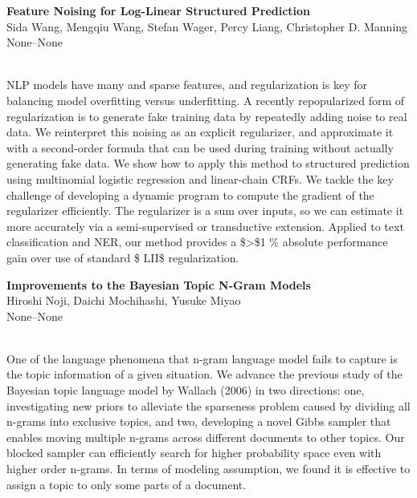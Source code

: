 \documentclass[twoside,makeidx]{book}
\begin{document}
\par\vspace{2em}\noindent%
\begin{minipage}{\linewidth}%
\begin{center}
\textbf{\normalsize Feature Noising for Log-Linear Structured Prediction}\\
\normalsize  Sida Wang,  Mengqiu Wang,  Stefan Wager,  Percy Liang,  Christopher D. Manning\\
{\small None--None}\\
\end{center}
\end{minipage}\\[0.5em]
\nopagebreak%
\noindent%
{\small NLP models have many and sparse features, and regularization is key for balancing model overfitting versus underfitting. A recently repopularized form of regularization is to generate fake training data by repeatedly adding noise to real data. We reinterpret this noising as an explicit regularizer, and approximate it with a second-order formula that can be used during training without actually generating fake data. We show how to apply this method to structured prediction using multinomial logistic regression and linear-chain CRFs. We tackle the key challenge of developing a dynamic program to compute the gradient of the regularizer efficiently. The regularizer is a sum over inputs, so we can estimate it more accurately via a semi-supervised or transductive extension. Applied to text classification and NER, our method provides a \$>\$1 \% absolute performance gain over use of standard \$ LII\$ regularization.}
\par\vspace{2em}\noindent%
\begin{minipage}{\linewidth}%
\begin{center}
\textbf{\normalsize Improvements to the Bayesian Topic N-Gram Models}\\
\normalsize  Hiroshi Noji,  Daichi Mochihashi,  Yusuke Miyao\\
{\small None--None}\\
\end{center}
\end{minipage}\\[0.5em]
\nopagebreak%
\noindent%
{\small One of the language phenomena that n-gram language model fails to capture is the topic information of a given situation. We advance the previous study of the Bayesian topic language model by Wallach (2006) in two directions: one, investigating new priors to alleviate the sparseness problem caused by dividing all n-grams into exclusive topics, and two, developing a novel Gibbs sampler that enables moving multiple n-grams across different documents to other topics. Our blocked sampler can efficiently search for higher probability space even with higher order n-grams. In terms of modeling assumption, we found it is effective to assign a topic to only some parts of a document.}
\end{document}
